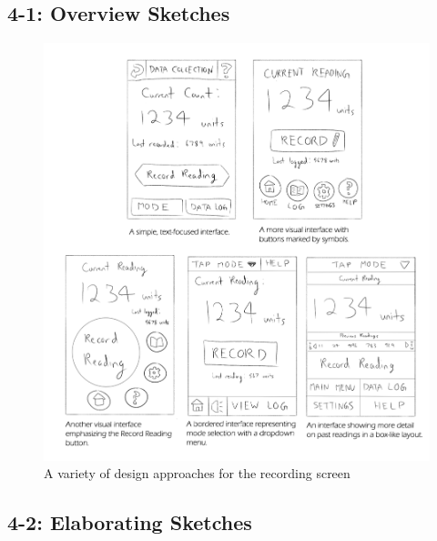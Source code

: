 \documentclass[11pt,a4paper]{article}
\begin{document}
\subsection*{4-1: Overview Sketches}
\bigskip
\begin{figure}[h]
  \centering
      \includegraphics[width=1.1\textwidth]{overviewsketches.png}
  \caption{A variety of design approaches for the recording screen}
\end{figure}

\newpage
\subsection*{4-2: Elaborating Sketches}
\end{document}
